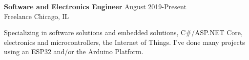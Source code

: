 \textbf{Software and Electronics Engineer} \hfill August 2019-Present \\
Freelance \hfill Chicago, IL
\begin{description} \itemsep -2pt %
\item Specializing in software solutions and embedded solutions,
 C\#/ASP.NET Core, electronics and microcontrollers, the Internet
 of Things. I've done many projects using an ESP32 and/or the
 Arduino Platform.
\end{description}